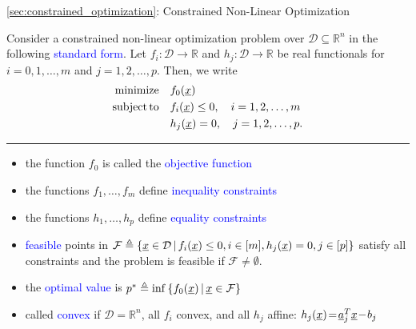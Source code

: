 \documentclass[10pt,english,aspectratio=169]{beamer}
\begin{document}
\begin{frame}{{\ref{sec:constrained_optimization}}: Constrained Non-Linear Optimization}

Consider a constrained non-linear optimization problem over $\mathcal{D} \subseteq \mathbb{R}^n$  in the following \textcolor{blue}{standard form}.
Let $f_i \colon \mathcal{D} \rightarrow \mathbb{R}$ and $h_j \colon \mathcal{D} \rightarrow \mathbb{R}$ be real functionals for $i=0,1,\ldots,m$ and $j=1,2,\ldots,p$.
Then, we write
\begin{align*}
\mathrm{minimize} \quad & f_0 (\underline{x}) \\
\mathrm{subject\,to} \quad & f_i (\underline{x}) \leq 0, \quad i=1,2,\ldots,m \\
& h_j (\underline{x}) = 0, \quad j=1,2,\ldots,p.
\end{align*}

\hrule

\begin{itemize}
\item<2-> the function $f_0$ is called the \textcolor{blue}{objective function}
\item<3-> the functions $f_1,\ldots,f_m$ define \textcolor{blue}{inequality constraints}
\item<4-> the functions $h_1,\ldots,h_p$ define \textcolor{blue}{equality constraints}
\item<5-> \textcolor{blue}{feasible} points in $\mathcal{F} \triangleq \{ \underline{x}\in \mathcal{D} \, | \,  f_i (\underline{x}) \leq 0, i\in [m], h_j (\underline{x}) = 0, j\in[p] \}$ satisfy all constraints and the problem is feasible if $\mathcal{F} \neq \emptyset$.
\item<6-> the \textcolor{blue}{optimal value} is $p^* \triangleq \inf \left\{ f_0 (\underline{x}) \, | \, \underline{x} \in \mathcal{F} \right\}$
\item<7-> called \textcolor{blue}{convex} if $\mathcal{D}=\mathbb{R}^n$, all $f_i$ convex, and all $h_j$ affine: $h_j (\underline{x}) \!=\! \underline{a}_j^T \underline{x} \!-\! b_j \!\!\!$ 
\end{itemize}

\end{frame}
\end{document}
